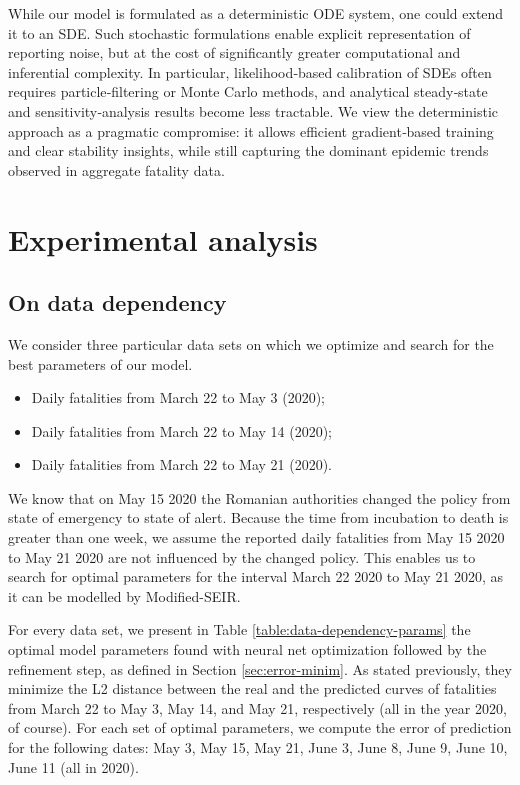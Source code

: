 \documentclass[11pt]{article}
\begin{document}
While our model is formulated as a deterministic ODE system, one could extend it to an SDE. Such stochastic formulations enable explicit representation of reporting noise, but at the cost of significantly greater computational and inferential complexity. In particular, likelihood‐based calibration of SDEs often requires particle‐filtering or Monte Carlo methods, and analytical steady‐state and sensitivity‐analysis results become less tractable. We view the deterministic approach as a pragmatic compromise: it allows efficient gradient‐based training and clear stability insights, while still capturing the dominant epidemic trends observed in aggregate fatality data.

\section{Experimental analysis}

\subsection{On data dependency}

We consider three particular data sets on which we optimize and search for the best parameters of our model.

\begin{itemize}
    \item Daily fatalities from March 22 to May 3  (2020);
    \item Daily fatalities from March 22 to May 14 (2020);
    \item Daily fatalities from March 22 to May 21 (2020).
\end{itemize}

We know that on May 15 2020 the Romanian authorities changed the policy from state of emergency to state of alert. Because the time from incubation to death is greater than one week, we assume the reported daily fatalities from May 15 2020 to May 21 2020 are not influenced by the changed policy. This enables us to search for optimal parameters for the interval March 22 2020 to May 21 2020, as it can be modelled by Modified-SEIR.

For every data set, we present in Table \ref{table:data-dependency-params} the optimal model parameters found with neural net optimization followed by the refinement step, as defined in Section \ref{sec:error-minim}. As stated previously, they minimize the L2 distance between the real and the predicted curves of fatalities from March 22 to May 3, May 14, and May 21, respectively (all in the year 2020, of course). For each set of optimal parameters, we compute the error of prediction for the following dates: May 3, May 15, May 21, June 3, June 8, June 9, June 10, June 11 (all in 2020).
\end{document}
